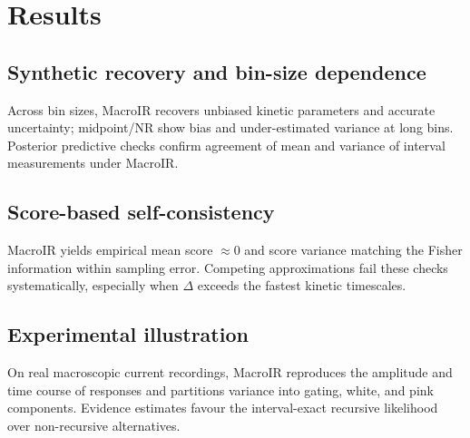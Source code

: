 \documentclass[9pt]{elife}
\begin{document}
\section*{Results}
\subsection*{Synthetic recovery and bin-size dependence}
Across bin sizes, MacroIR recovers unbiased kinetic parameters and accurate uncertainty; midpoint/NR show bias and under-estimated variance at long bins. Posterior predictive checks confirm agreement of mean and variance of interval measurements under MacroIR.


\subsection*{Score-based self-consistency}
MacroIR yields empirical mean score $\approx 0$ and score variance matching the Fisher information within sampling error. Competing approximations fail these checks systematically, especially when $\Delta$ exceeds the fastest kinetic timescales.


\subsection*{Experimental illustration}
On real macroscopic current recordings, MacroIR reproduces the amplitude and time course of responses and partitions variance into gating, white, and pink components. Evidence estimates favour the interval-exact recursive likelihood over non-recursive alternatives.

\end{document}
